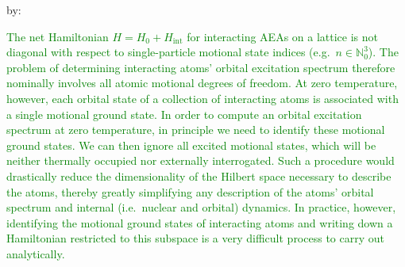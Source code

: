 \documentclass[preprint]{revtex4-1}
\renewcommand{\t}{\text} %
\newcommand{\1}{\mathds{1}}
\newcommand{\green}[1]{\textcolor{green}{#1}}
\begin{document}
\begin{enumerate}
  by:

  \green{The net Hamiltonian $H = H_0 + H_{\t{int}}$ for interacting
    AEAs on a lattice is not diagonal with respect to single-particle
    motional state indices (e.g.~$n\in\mathbb{N}_0^3$).  The problem
    of determining interacting atoms' orbital excitation spectrum
    therefore nominally involves all atomic motional degrees of
    freedom.  At zero temperature, however, each orbital state of a
    collection of interacting atoms is associated with a single
    motional ground state.  In order to compute an orbital excitation
    spectrum at zero temperature, in principle we need to identify
    these motional ground states.  We can then ignore all excited
    motional states, which will be neither thermally occupied nor
    externally interrogated.  Such a procedure would drastically
    reduce the dimensionality of the Hilbert space necessary to
    describe the atoms, thereby greatly simplifying any description of
    the atoms' orbital spectrum and internal (i.e.~nuclear and
    orbital) dynamics.  In practice, however, identifying the motional
    ground states of interacting atoms and writing down a Hamiltonian
    restricted to this subspace is a very difficult process to carry
    out analytically.}


\end{enumerate}
\end{document}
